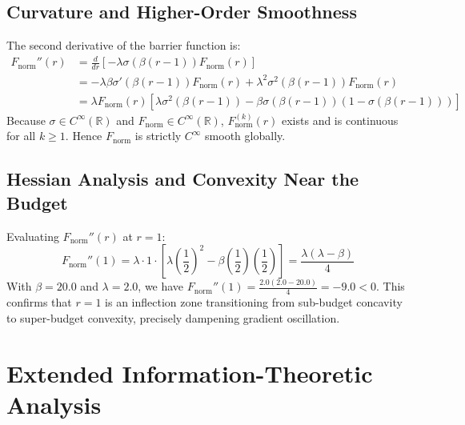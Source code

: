 \documentclass[11pt, a4paper]{article}
\begin{document}
\subsection{Curvature and Higher-Order Smoothness}
\label{sec:higher_order}

The second derivative of the barrier function is:
\begin{align}
    F_{\text{norm}}''(r) &= \frac{d}{dr} \left[ -\lambda \sigma(\beta(r - 1)) F_{\text{norm}}(r) \right] \\
    &= -\lambda \beta \sigma'(\beta(r - 1)) F_{\text{norm}}(r) + \lambda^2 \sigma^2(\beta(r - 1)) F_{\text{norm}}(r) \\
    &= \lambda F_{\text{norm}}(r) \left[ \lambda \sigma^2(\beta(r - 1)) - \beta \sigma(\beta(r - 1))(1 - \sigma(\beta(r - 1))) \right]
\end{align}
Because $\sigma \in C^\infty(\mathbb{R})$ and $F_{\text{norm}} \in C^\infty(\mathbb{R})$, $F_{\text{norm}}^{(k)}(r)$ exists and is continuous for all $k \ge 1$. Hence $F_{\text{norm}}$ is strictly $C^\infty$ smooth globally.

\subsection{Hessian Analysis and Convexity Near the Budget}
\label{sec:hessian_properties}
Evaluating $F_{\text{norm}}''(r)$ at $r = 1$:
\begin{equation}
    F_{\text{norm}}''(1) = \lambda \cdot 1 \cdot \left[ \lambda \left(\frac{1}{2}\right)^2 - \beta \left(\frac{1}{2}\right)\left(\frac{1}{2}\right) \right] = \frac{\lambda(\lambda - \beta)}{4}
\end{equation}
With $\beta = 20.0$ and $\lambda = 2.0$, we have $F_{\text{norm}}''(1) = \frac{2.0(2.0 - 20.0)}{4} = -9.0 < 0$. This confirms that $r = 1$ is an inflection zone transitioning from sub-budget concavity to super-budget convexity, precisely dampening gradient oscillation.

\section{Extended Information-Theoretic Analysis}
\label{sec:appendix_info_theory}
\end{document}
